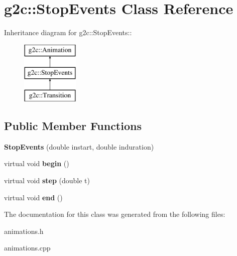 \hypertarget{classg2c_1_1_stop_events}{
\section{g2c::StopEvents Class Reference}
\label{classg2c_1_1_stop_events}
}
Inheritance diagram for g2c::StopEvents::\begin{figure}[H]
\begin{center}
\leavevmode
\includegraphics[height=3cm]{classg2c_1_1_stop_events}
\end{center}
\end{figure}
\subsection*{Public Member Functions}
\begin{DoxyCompactItemize}
\item 
\hypertarget{classg2c_1_1_stop_events_a371e14fed65cfe6e2451722b43451e5c}{
{\bfseries StopEvents} (double instart, double induration)}
\label{classg2c_1_1_stop_events_a371e14fed65cfe6e2451722b43451e5c}

\item 
\hypertarget{classg2c_1_1_stop_events_addfa8729eef29fba678692329d4bbfac}{
virtual void {\bfseries begin} ()}
\label{classg2c_1_1_stop_events_addfa8729eef29fba678692329d4bbfac}

\item 
\hypertarget{classg2c_1_1_stop_events_a045bcb0ad3f36ec93db2dc85167bb44e}{
virtual void {\bfseries step} (double t)}
\label{classg2c_1_1_stop_events_a045bcb0ad3f36ec93db2dc85167bb44e}

\item 
\hypertarget{classg2c_1_1_stop_events_a7fc7657d0c4679b84a6d811580014fa4}{
virtual void {\bfseries end} ()}
\label{classg2c_1_1_stop_events_a7fc7657d0c4679b84a6d811580014fa4}

\end{DoxyCompactItemize}


The documentation for this class was generated from the following files:\begin{DoxyCompactItemize}
\item 
animations.h\item 
animations.cpp\end{DoxyCompactItemize}
